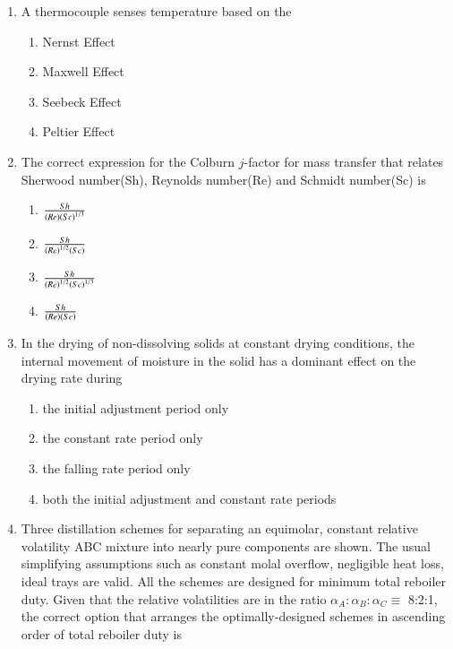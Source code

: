\documentclass[journal,12pt,onecolumn]{IEEEtran}
\theoremstyle{remark}
\begin{document}
\begin{enumerate}
      \item  A thermocouple senses temperature based on the 
      
 \hfill{}
  

\begin{multicols}{4}
    \begin{enumerate}
        \item Nernst Effect
        \item Maxwell Effect
        \item Seebeck Effect
        \item Peltier Effect
    \end{enumerate}
\end{multicols}

    \item The correct expression for the Colburn $j$-factor for mass transfer that relates Sherwood number(Sh), Reynolds number(Re) and Schmidt number(Sc) is
    
 \hfill{}
\begin{multicols}{4}
    \begin{enumerate}
        \item $\frac{Sh}{\left(Re\right)\left(Sc\right)^{1/3}}$
        \item $\frac{Sh}{\left(Re\right)^{1/2}\left(Sc\right)}$
        \item $\frac{Sh}{\left(Re\right)^{1/2}\left(Sc\right)^{1/3}}$
        \item $\frac{Sh}{\left(Re\right)\left(Sc\right)}$
    \end{enumerate}
\end{multicols}

    \item In the drying of non-dissolving solids at constant drying conditions, the internal movement of moisture in the solid has a dominant effect on the drying rate during
    
     \hfill{}
\begin{enumerate}
    \item the initial adjustment period only
    \item the constant rate period only
    \item the falling rate period only
    \item both the initial adjustment and constant rate periods
\end{enumerate}

    \item Three distillation schemes for separating an equimolar, constant relative volatility ABC mixture into nearly pure components are shown. The usual simplifying assumptions such as constant molal overflow, negligible heat loss, ideal trays are valid. All the schemes are designed for minimum total reboiler duty. Given that the relative volatilities are in the ratio $\alpha_A:\alpha_B:\alpha_C \equiv$ 8:2:1, the correct option that arranges the optimally-designed schemes in ascending order of total reboiler duty is
    

\end{enumerate}
\end{document}
